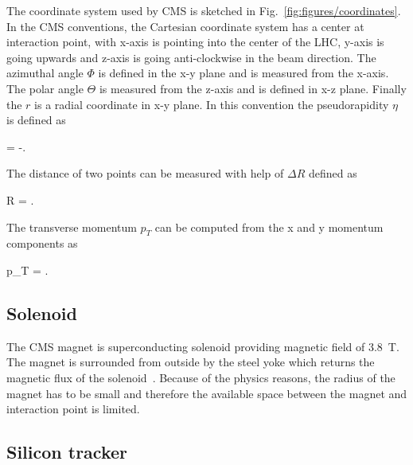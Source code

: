 The coordinate system used by CMS is sketched in Fig.~\ref{fig:figures/coordinates}. In the CMS conventions, the Cartesian coordinate system has a center at interaction point, with x-axis is pointing into the center of the LHC, y-axis is going upwards and z-axis is going anti-clockwise in the beam direction. The azimuthal angle $\Phi$ is defined in the x-y plane and is measured from the x-axis. The polar angle $\Theta$ is measured from the z-axis and is defined in x-z plane. Finally the $r$ is a radial coordinate in x-y plane. In this convention the pseudorapidity $\eta$ is defined as

{
    \eta =  -\ln {}.
}

The distance of two points can be measured with help of $\Delta R$ defined as

{
    \Delta R = .
}


The transverse momentum $p_{T}$ can be computed from the x and y momentum components as

{
    p_{T} =  .
}


\subsection{Solenoid}


The CMS magnet is superconducting solenoid providing magnetic field of 3.8~T. The magnet is surrounded from outside by the steel yoke which returns the magnetic flux of the solenoid~\cite{tdrMagnet}. Because of the physics reasons, the radius of the magnet has to be small and therefore the available space between the magnet and interaction point is limited.

\subsection{Silicon tracker}

